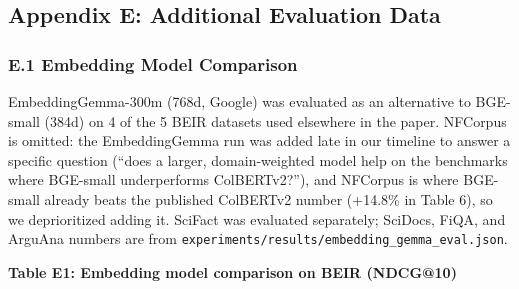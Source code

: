 \documentclass[
  11pt]{article}
\begin{document}
\subsection{Appendix E: Additional Evaluation Data}\label{appendix-e-additional-evaluation-data}

\subsubsection{E.1 Embedding Model Comparison}\label{e.1-embedding-model-comparison}

EmbeddingGemma-300m (768d, Google) was evaluated as an alternative to BGE-small (384d) on 4 of the 5 BEIR datasets used elsewhere in the paper. NFCorpus is omitted: the EmbeddingGemma run was added late in our timeline to answer a specific question (``does a larger, domain-weighted model help on the benchmarks where BGE-small underperforms ColBERTv2?''), and NFCorpus is where BGE-small already beats the published ColBERTv2 number (+14.8\% in Table 6), so we deprioritized adding it. SciFact was evaluated separately; SciDocs, FiQA, and ArguAna numbers are from \texttt{experiments/results/embedding\_gemma\_eval.json}.

\textbf{Table E1: Embedding model comparison on BEIR (NDCG@10)}
\end{document}
